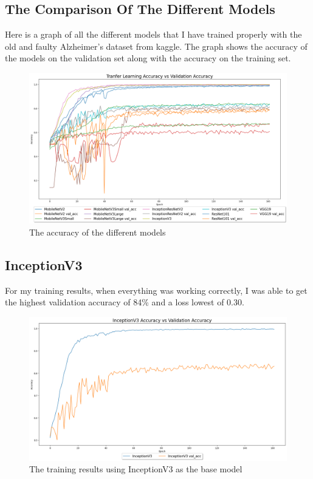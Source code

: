 \documentclass[]{final_report}
\begin{document}
\subsection{The Comparison Of The Different Models}
Here is a graph of all the different models that I have trained properly with the old and faulty Alzheimer's dataset from kaggle.
The graph shows the accuracy of the models on the validation set along with the accuracy on the training set.
\begin{figure}[h]
  \centering
  \includegraphics[width=1\textwidth]{images/good-training-acc-vs-val.png}
  \caption{The accuracy of the different models}
  \label{fig:loss}
\end{figure}
\pagebreak

\subsection{InceptionV3}
For my training results, when everything was working correctly, I was able to get the highest validation accuracy of 84\% and a loss lowest of 0.30.
\begin{figure}[ht!]
  \centering
  \includegraphics[width=120mm]{images/inceptionv3-accuracy-vs-val-acc.png}
  \caption{The training results using InceptionV3\cite{DBLP:journals/corr/SzegedyVISW15} as the base model}
\end{figure}
\end{document}

